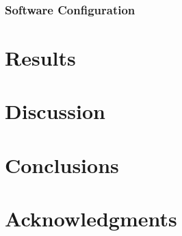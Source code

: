 \documentclass[]{sig-alternate}
\begin{document}
\subsubsection{Software Configuration}




\section{Results}\label{sec:results}

\section{Discussion}\label{sec:discussion} 

\section{Conclusions}\label{sec:conclusions}
  

\section{Acknowledgments}



\end{document}
